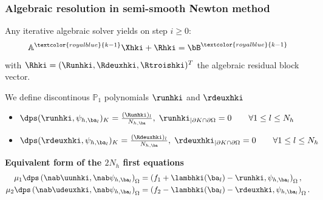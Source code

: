 \documentclass[10 pt]{beamer}
\begin{document}
\begin{frame}
\frametitle{Algebraic resolution in semi-smooth Newton method}
Any iterative algebraic
solver yields on step $i \geq 0$:
\begin{equation*}
\mathbb{A}^{\textcolor{royalblue}{k-1}}\Xhki + \Rhki=\bB^{\textcolor{royalblue}{k-1}}
\end{equation*}
with $\Rhki=(\Runhki,\Rdeuxhki,\Rtroishki)^{T}$ the algebraic residual block vector.
\begin{definition}
We define discontinous $\mathbb{P}_1$ polynomials $\runhki$ and $\rdeuxhki$ %
\begin{itemize}
\item $\dps (\runhki, \psi_{h,\ba_l})_K=\frac{(\Runhki)_l}{N_{h,\ba}}, \; {\runhki}_{|\partial K \cap \partial \Omega} =0 \qquad \forall 1 \leq l \leq N_h$
\item $\dps (\rdeuxhki, \psi_{h,\ba_l})_K=\frac{(\Rdeuxhki)_l}{N_{h,\ba}}, \; {\rdeuxhki}_{|\partial K \cap \partial \Omega} =0 \qquad \forall 1 \leq l \leq N_h$
\end{itemize}
\end{definition}

%
\textbf{Equivalent form of the $2N_h$ first equations}
\begin{align*}
\nonumber\mu_1\dps \left(\nab \uunhki, \nab \psi_{h,{{\ba}_l}}\right)_{\Omega}&=\left(f_1+\lambhki({{\ba}_l})-\runhki,\psi_{h,\ba_l}\right)_{\Omega},\\
\mu_2 \dps \left(\nab \udeuxhki, \nab \psi_{h,{{\ba}_l}}\right)_{\Omega}&=    \left(f_2-\lambhki({{\ba}_l})-\rdeuxhki, \psi_{h,{\ba}_l}\right)_{\Omega}.
\label{eq:variational:formulation:inexacte_newton}
\end{align*}
\end{frame}
\end{document}
